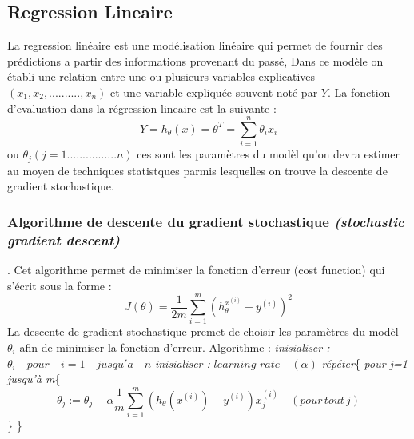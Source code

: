 \documentclass[a4paper,12pt]{report}
\begin{document}
\subsection*{Regression Lineaire}
La regression linéaire est une modélisation linéaire qui permet de fournir des prédictions a partir des informations provenant du passé, 
Dans ce modèle on établi une relation entre une ou plusieurs variables explicatives $(x_1,x_2,..........,x_n)$ et une variable expliquée souvent noté par $Y$.\newline
La fonction d'evaluation dans la régression lineaire est la suivante : \newline
$$Y =h_{\theta}(x) = \theta^T = \sum_{i=1}^{n} \theta_ix_i $$\newline
ou $\theta_j (j=1................n)$ ces sont les paramètres du modèl qu'on devra estimer au moyen de techniques statistques parmis  lesquelles on trouve la descente de gradient stochastique.\newline
\subsubsection{Algorithme de descente du gradient stochastique \textit{(stochastic gradient descent)}}.\newline
Cet algorithme permet de minimiser la fonction d'erreur (cost function) qui s'écrit sous la forme : \newline
$$J(\theta) = \dfrac{1}{2m}\sum_{i=1}^{m} (h_{\theta}^{x^{(i)}} - y^{(i)})^2$$\newline  
\newline
La descente de gradient stochastique premet de choisir les paramètres du modèl $\theta_i$ afin de minimiser la fonction d'erreur.\newline
Algorithme : \newline
\textit{inisialiser :} $\theta_i\quad pour\quad i=1 \quad jusqu'a\quad n$\newline
\textit{inisialiser : }$learning\_rate\quad(\alpha)$\newline
\textit{répéter}\{\newline 
\hspace*{1cm}\textit{pour j=1 jusqu'à m}\{
$$\theta_j := \theta_j - \alpha  \dfrac{1}{m}\sum_{i = 1}^{m} (h_\theta(x^{(i)}) - y^{(i)})x_j^{(i)} \quad(pour\, tout \, j)$$
\hspace*{1cm}\}\newline
\} 
\end{document}
